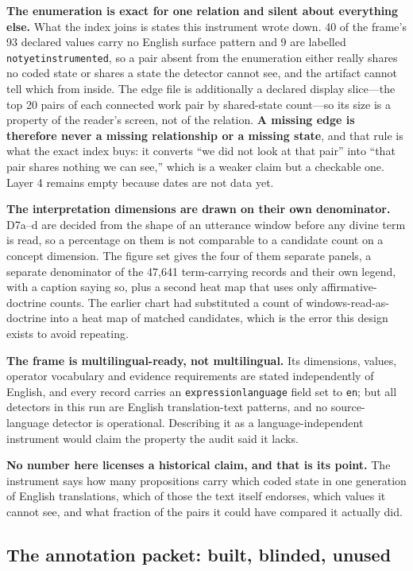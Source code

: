 \documentclass[11pt]{article}
\DeclareRobustCommand{\_}{\textunderscore\allowbreak}
\newcommand{\field}[1]{\texttt{\small #1}}
\begin{document}
\textbf{The enumeration is exact for one relation and silent about everything else.}
What the index joins is states this instrument wrote down. 40 of the frame's 93
declared values carry no English surface pattern and 9 are labelled
\field{not\_yet\_instrumented}, so a pair absent from the enumeration either really
shares no coded state or shares a state the detector cannot see, and the artifact
cannot tell which from inside. The edge file is additionally a declared display
slice---the top 20 pairs of each connected work pair by shared-state count---so its
size is a property of the reader's screen, not of the relation. \textbf{A missing
edge is therefore never a missing relationship or a missing state}, and that rule is
what the exact index buys: it converts ``we did not look at that pair'' into ``that
pair shares nothing we can see,'' which is a weaker claim but a checkable one. Layer
4 remains empty because dates are not data yet.

\textbf{The interpretation dimensions are drawn on their own denominator.}
D7a--d are decided from the shape of an utterance window before any divine term is
read, so a percentage on them is not comparable to a candidate count on a concept
dimension. The figure set gives the four of them separate panels, a separate
denominator of the 47{,}641 term-carrying records and their own legend, with a
caption saying so, plus a second heat map that uses only affirmative-doctrine
counts. The earlier chart had substituted a count of windows-read-as-doctrine into
a heat map of matched candidates, which is the error this design exists to avoid
repeating.

\textbf{The frame is multilingual-ready, not multilingual.} Its dimensions,
values, operator vocabulary and evidence requirements are stated independently of
English, and every record carries an \field{expression\_language} field set to
\texttt{en}; but all detectors in this run are English translation-text patterns,
and no source-language detector is operational. Describing it as a
language-independent instrument would claim the property the audit said it lacks.

\textbf{No number here licenses a historical claim, and that is its point.} The
instrument says how many propositions carry which coded state in one generation of
English translations, which of those the text itself endorses, which values it
cannot see, and what fraction of the pairs it could have compared it actually did.

\subsection{The annotation packet: built, blinded, unused}
\end{document}
